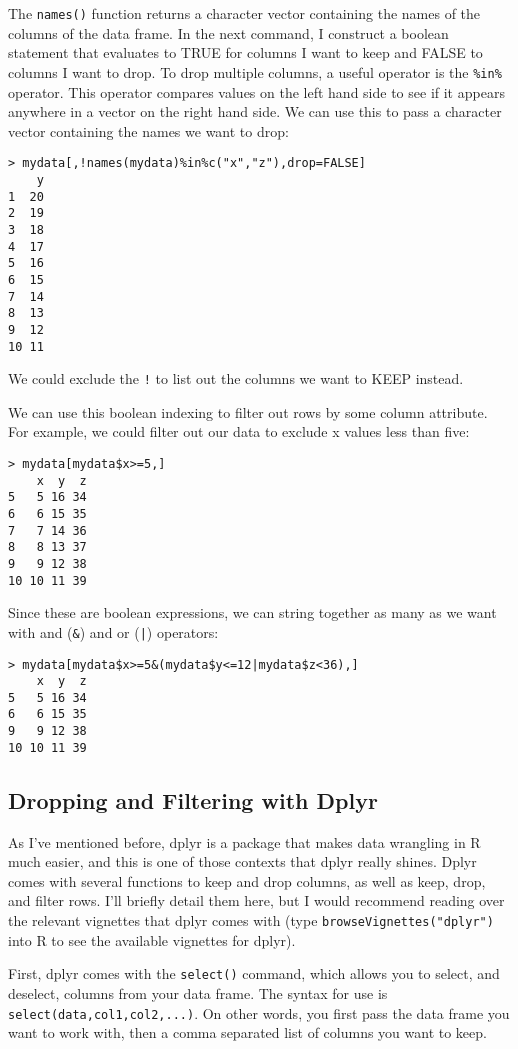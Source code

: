 \documentclass[12pt, oneside]{amsart}   	%
\begin{document}
The \texttt{names()} function returns a character vector containing the names of the columns of the data frame. In the next command, I construct a boolean statement that evaluates to TRUE for columns I want to keep and FALSE to columns I want to drop. To drop multiple columns, a useful operator is the \texttt{\%in\%} operator. This operator compares values on the left hand side to see if it appears anywhere in a vector on the right hand side. We can use this to pass a character vector containing the names we want to drop:

\begin{verbatim}
> mydata[,!names(mydata)%in%c("x","z"),drop=FALSE]
    y
1  20
2  19
3  18
4  17
5  16
6  15
7  14
8  13
9  12
10 11
\end{verbatim}

We could exclude the \texttt{!} to list out the columns we want to KEEP instead. 

We can use this boolean indexing to filter out rows by some column attribute. For example, we could filter out our data to exclude x values less than five:

\begin{verbatim}
> mydata[mydata$x>=5,]
    x  y  z
5   5 16 34
6   6 15 35
7   7 14 36
8   8 13 37
9   9 12 38
10 10 11 39
\end{verbatim}

Since these are boolean expressions, we can string together as many as we want with and (\texttt{\&}) and or (\texttt{|}) operators:

\begin{verbatim}
> mydata[mydata$x>=5&(mydata$y<=12|mydata$z<36),]
    x  y  z
5   5 16 34
6   6 15 35
9   9 12 38
10 10 11 39
\end{verbatim}

\subsection{Dropping and Filtering with Dplyr}

As I've mentioned before, dplyr is a package that makes data wrangling in R much easier, and this is one of those contexts that dplyr really shines. Dplyr comes with several functions to keep and drop columns, as well as keep, drop, and filter rows. I'll briefly detail them here, but I would recommend reading over the relevant vignettes that dplyr comes with (type \texttt{browseVignettes("dplyr")} into R to see the available vignettes for dplyr).

First, dplyr comes with the \texttt{select()} command, which allows you to select, and deselect, columns from your data frame. The syntax for use is \texttt{select(data,col1,col2,...)}. On other words, you first pass the data frame you want to work with, then a comma separated list of columns you want to keep.
\end{document}
